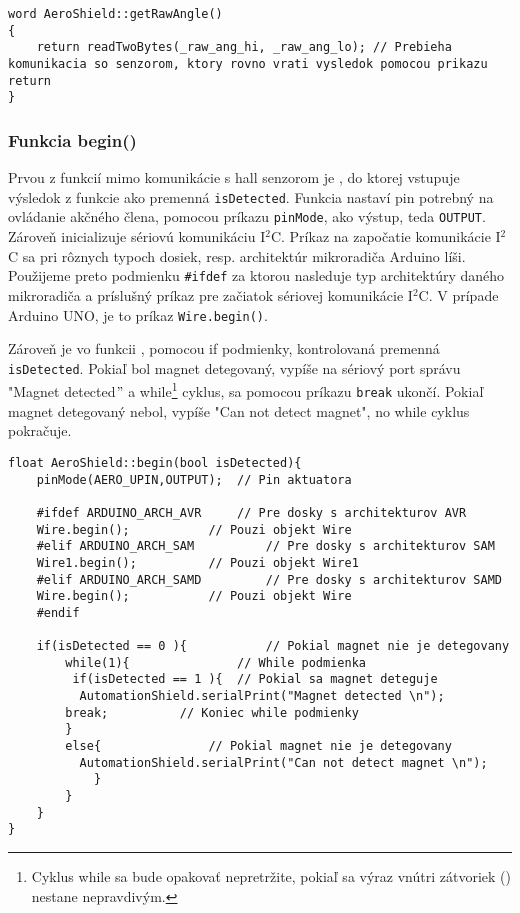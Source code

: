 \begin{lstlisting}[caption={Zdrojový kód funkcie getRawAngle.},captionpos=b]
word AeroShield::getRawAngle() 
{
	return readTwoBytes(_raw_ang_hi, _raw_ang_lo); // Prebieha komunikacia so senzorom, ktory rovno vrati vysledok pomocou prikazu return 
}
\end{lstlisting}

\subsubsection{Funkcia begin()}

Prvou z funkcií mimo komunikácie s hall senzorom je , do ktorej vstupuje výsledok z funkcie  ako premenná \verb|isDetected|. Funkcia  nastaví pin potrebný na ovládanie akčného člena, pomocou príkazu \verb|pinMode|, ako výstup, teda \verb|OUTPUT|. Zároveň inicializuje sériovú komunikáciu I$^{2}$C. Príkaz na započatie komunikácie I$^{2}$C sa pri rôznych typoch dosiek, resp. architektúr mikroradiča Arduino líši. Použijeme preto podmienku \verb|#ifdef| za ktorou nasleduje typ architektúry daného mikroradiča a príslušný príkaz pre začiatok sériovej komunikácie I$^{2}$C. V prípade Arduino UNO, je to príkaz \verb|Wire.begin()|. 

Zároveň je vo funkcii , pomocou if podmienky, kontrolovaná premenná \verb|isDetected|. Pokiaľ bol magnet detegovaný, vypíše na sériový port správu "Magnet detected$"$ a while\footnote[8]{Cyklus while sa bude opakovať nepretržite, pokiaľ sa výraz vnútri zátvoriek () nestane nepravdivým.} cyklus, sa pomocou príkazu \verb|break| ukončí. Pokiaľ magnet detegovaný nebol, vypíše "Can not detect magnet", no while cyklus pokračuje.  


\begin{lstlisting}[caption={Zdrojový kód funkcie begin.},captionpos=b]
float AeroShield::begin(bool isDetected){ 
	pinMode(AERO_UPIN,OUTPUT);	// Pin aktuatora
	
	#ifdef ARDUINO_ARCH_AVR		// Pre dosky s architekturov AVR
	Wire.begin();			// Pouzi objekt Wire
	#elif ARDUINO_ARCH_SAM      	// Pre dosky s architekturov SAM
	Wire1.begin();			// Pouzi objekt Wire1
	#elif ARDUINO_ARCH_SAMD     	// Pre dosky s architekturov SAMD
	Wire.begin();			// Pouzi objekt Wire
	#endif
	
	if(isDetected == 0 ){       	// Pokial magnet nie je detegovany
		while(1){               // While podmienka
		 if(isDetected == 1 ){	// Pokial sa magnet deteguje
		  AutomationShield.serialPrint("Magnet detected \n");	
		break;		    // Koniec while podmienky
		}
		else{               // Pokial magnet nie je detegovany
		  AutomationShield.serialPrint("Can not detect magnet \n");
			}
		}
	}       
} 
\end{lstlisting}

